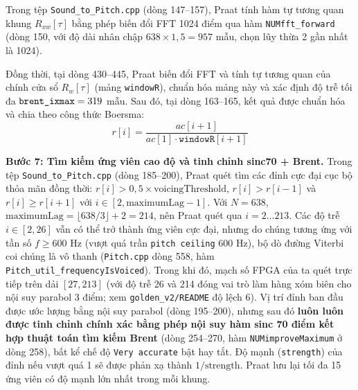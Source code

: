 Trong tệp \texttt{Sound\_to\_}\linebreak[0]\texttt{Pitch.cpp} (dòng 147--157), Praat tính hàm tự tương quan khung $R_{xw}[\tau]$ bằng phép biến đổi FFT 1024 điểm qua hàm \texttt{NUMfft\_}\linebreak[0]\texttt{forward} (dòng 150, với độ dài nhân chập $638 \times 1{,}5 = 957$ mẫu, chọn lũy thừa 2 gần nhất là 1024).

Đồng thời, tại dòng 430--445, Praat biến đổi FFT và tính tự tương quan của chính cửa sổ $R_w[\tau]$ (mảng \texttt{windowR}), chuẩn hóa mảng này và xác định độ trễ tối đa $\texttt{brent\_}\linebreak[0]\texttt{ixmax} = 319$ mẫu. Sau đó, tại dòng 163--165, kết quả được chuẩn hóa và chia theo công thức Boersma:
\begin{equation*}
r[i] = \frac{ac[i+1]}{ac[1] \cdot \texttt{windowR}[i+1]}
\end{equation*}

\textbf{Bước 7: Tìm kiếm ứng viên cao độ và tinh chỉnh sinc70 + Brent.}
Trong tệp \texttt{Sound\_to\_Pitch.cpp} (dòng 185--200), Praat quét tìm các đỉnh cực đại cục bộ thỏa mãn đồng thời: $r[i] > 0{,}5 \times \text{voicingThreshold}$, $r[i] > r[i-1]$ và $r[i] \ge r[i+1]$ với $i \in [2, \text{maximumLag}-1]$. Với $N=638$, $\text{maximumLag} = \lfloor 638/3 \rfloor + 2 = 214$, nên Praat quét qua $i = 2 \dots 213$. Các độ trễ $i \in [2, 26]$ vẫn có thể trở thành ứng viên cực đại, nhưng do chúng tương ứng với tần số $f \ge 600\text{ Hz}$ (vượt quá trần \texttt{pitch ceiling} 600 Hz), bộ dò đường Viterbi coi chúng là vô thanh (\texttt{Pitch.cpp} dòng 558, hàm \texttt{Pitch\_util\_frequencyIsVoiced}). Trong khi đó, mạch số FPGA của ta quét trực tiếp trên dải $[27, 213]$ (với độ trễ 26 và 214 đóng vai trò làm hàng xóm biên cho nội suy parabol 3 điểm; xem \texttt{golden\_v2/README} độ lệch 6). Vị trí đỉnh ban đầu được ước lượng bằng nội suy parabol (dòng 195--200), nhưng sau đó \textbf{luôn luôn được tinh chỉnh chính xác bằng phép nội suy hàm sinc 70 điểm kết hợp thuật toán tìm kiếm Brent} (dòng 254--270, hàm \texttt{NUMimproveMaximum} ở dòng 258), bất kể chế độ \texttt{Very accurate} bật hay tắt. Độ mạnh (\texttt{strength}) của đỉnh nếu vượt quá 1 sẽ được phản xạ thành $1/\text{strength}$. Praat lưu lại tối đa 15 ứng viên có độ mạnh lớn nhất trong mỗi khung.

